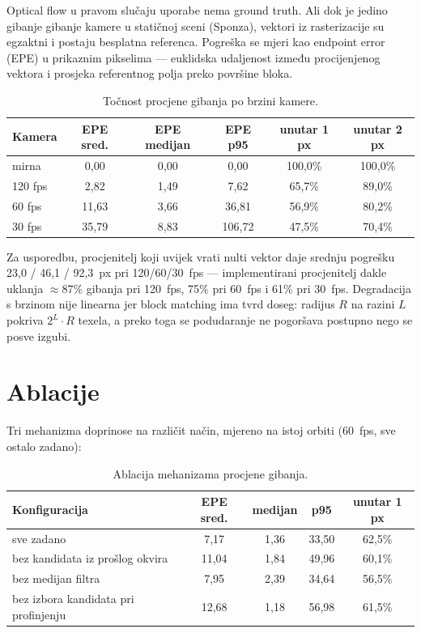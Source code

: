 \documentclass{mathos}
\begin{document}
Optical flow u pravom slučaju uporabe nema ground truth. Ali dok je jedino
gibanje gibanje kamere u statičnoj sceni (Sponza), vektori iz rasterizacije
su egzaktni i postaju besplatna referenca. Pogreška se mjeri kao endpoint
error (EPE) u prikaznim pikselima — euklidska udaljenost između procijenjenog
vektora i prosjeka referentnog polja preko površine bloka.

\begin{table}[hbtp]
\centering
\begin{tabular}{|l|c|c|c|c|c|}\hline
Kamera & EPE sred. & EPE medijan & EPE p95 & unutar 1 px & unutar 2 px \\\hline
mirna & 0,00 & 0,00 & 0,00 & 100,0\% & 100,0\% \\\hline
120 fps & 2,82 & 1,49 & 7,62 & 65,7\% & 89,0\% \\\hline
60 fps & 11,63 & 3,66 & 36,81 & 56,9\% & 80,2\% \\\hline
30 fps & 35,79 & 8,83 & 106,72 & 47,5\% & 70,4\% \\\hline
\end{tabular}
\caption{Točnost procjene gibanja po brzini kamere.}
\label{table_m6_brzina}
\end{table}

Za usporedbu, procjenitelj koji uvijek vrati nulti vektor daje srednju
pogrešku 23,0 / 46,1 / 92,3~px pri 120/60/30~fps — implementirani procjenitelj
dakle uklanja $\approx$87\% gibanja pri 120~fps, 75\% pri 60~fps i 61\% pri
30~fps. Degradacija s brzinom nije linearna jer block matching ima tvrd
doseg: radijus $R$ na razini $L$ pokriva $2^L\cdot R$ texela, a preko toga se
podudaranje ne pogoršava postupno nego se posve izgubi.

\section{Ablacije}

Tri mehanizma doprinose na različit način, mjereno na istoj orbiti (60~fps,
sve ostalo zadano):

\begin{table}[hbtp]
\centering
\begin{tabular}{|l|c|c|c|c|}\hline
Konfiguracija & EPE sred. & medijan & p95 & unutar 1 px \\\hline
sve zadano & 7,17 & 1,36 & 33,50 & 62,5\% \\\hline
bez kandidata iz prošlog okvira & 11,04 & 1,84 & 49,96 & 60,1\% \\\hline
bez medijan filtra & 7,95 & 2,39 & 34,64 & 56,5\% \\\hline
bez izbora kandidata pri profinjenju & 12,68 & 1,18 & 56,98 & 61,5\% \\\hline
\end{tabular}
\caption{Ablacija mehanizama procjene gibanja.}
\label{table_m6_ablacija}
\end{table}
\end{document}
